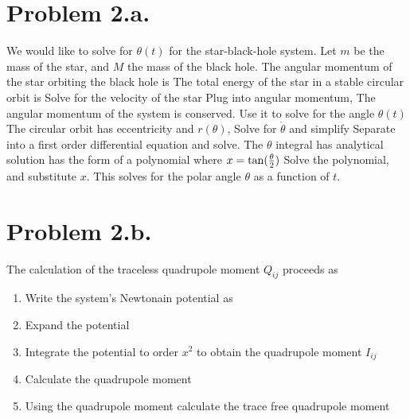 \documentclass{article}
\begin{document}
\section*{Problem 2.a.}
We would like to solve for $\theta(t)$ for the star-black-hole system. Let $m$ be the mass of the star, and $M$ the mass of the black hole. The angular momentum of the star orbiting the black hole is
The total energy of the star in a stable circular orbit is
Solve for the velocity of the star
Plug into angular momentum,
The angular momentum of the system is conserved. Use it to solve for the angle $\theta(t)$
The circular orbit has eccentricity
and $r(\theta)$,
Solve for $\dot{\theta}$ and simplify
Separate into a first order differential equation and solve.
The $\theta$ integral has analytical solution
 has the form of a polynomial where $x=\tan(\frac{\theta}{2})$
Solve the polynomial, and substitute $x$. This solves for the polar angle $\theta$ as a function of $t$.
\section*{Problem 2.b.}
The calculation of the traceless quadrupole moment $Q_{ij}$ proceeds as 
\begin{enumerate}
\item Write the system's Newtonain potential as
\item Expand the potential
\item Integrate the potential to order $x^2$ to obtain the quadrupole moment $I_{ij}$
\item Calculate the quadrupole moment
\item Using the quadrupole moment calculate the trace free quadrupole moment
\end{enumerate}
\end{document}
